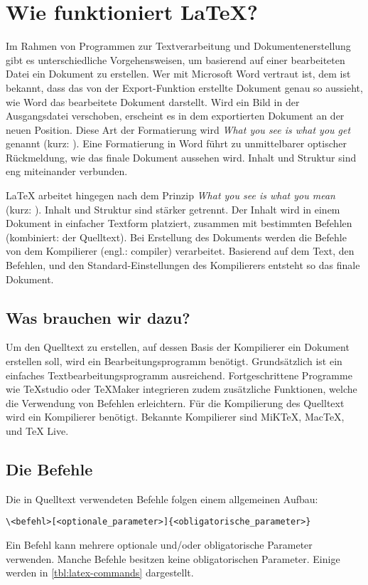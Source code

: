 \section{Wie funktioniert \LaTeX?}
\label{sec:wie_funktioniert_latex_}

Im Rahmen von Programmen zur Textverarbeitung und Dokumentenerstellung gibt es unterschiedliche Vorgehensweisen, um basierend auf einer bearbeiteten Datei ein Dokument zu erstellen. Wer mit Microsoft Word vertraut ist, dem ist bekannt, dass das von der Export-Funktion erstellte Dokument genau so aussieht, wie Word das bearbeitete Dokument darstellt. Wird ein Bild in der Ausgangsdatei verschoben, erscheint es in dem exportierten Dokument an der neuen Position. Diese Art der Formatierung wird \emph{What you see is what you get} genannt (kurz: ). Eine Formatierung in Word führt zu unmittelbarer optischer Rückmeldung, wie das finale Dokument aussehen wird. Inhalt und Struktur sind eng miteinander verbunden.

\LaTeX{} arbeitet hingegen nach dem Prinzip \emph{What you see is what you mean} (kurz: ). Inhalt und Struktur sind stärker getrennt. Der Inhalt wird in einem Dokument in einfacher Textform platziert, zusammen mit bestimmten Befehlen (kombiniert: der Quelltext). Bei Erstellung des Dokuments werden die Befehle von dem Kompilierer (engl.: compiler) verarbeitet. Basierend auf dem Text, den Befehlen, und den Standard-Einstellungen des Kompilierers entsteht so das finale Dokument. 

\subsection{Was brauchen wir dazu?}
\label{sub:was_brauchen_wir_dazu}
Um den Quelltext zu erstellen, auf dessen Basis der Kompilierer ein Dokument erstellen soll, wird ein Bearbeitungsprogramm benötigt. Grundsätzlich ist ein einfaches Textbearbeitungsprogramm ausreichend. Fortgeschrittene Programme wie TeXstudio oder TeXMaker integrieren zudem zusätzliche Funktionen, welche die Verwendung von Befehlen erleichtern.
Für die Kompilierung des Quelltext wird ein Kompilierer benötigt. Bekannte Kompilierer sind MiK\TeX, Mac\TeX, und \TeX{} Live.

\subsection{Die Befehle}
\label{sub:die_befehle}
Die in Quelltext verwendeten Befehle folgen einem allgemeinen Aufbau:
\begin{verbatim}
\<befehl>[<optionale_parameter>]{<obligatorische_parameter>}
\end{verbatim}
Ein Befehl kann mehrere optionale und/oder obligatorische Parameter verwenden. Manche Befehle besitzen keine obligatorischen Parameter. Einige werden in \cref{tbl:latex-commands} dargestellt.

